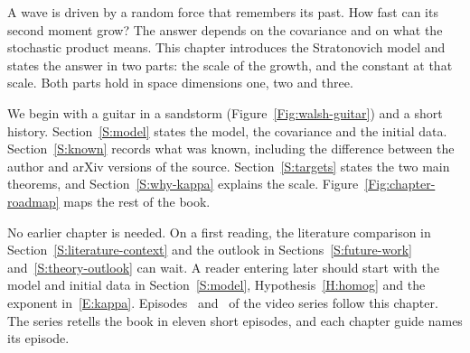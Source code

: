 A wave is driven by a random force that remembers its past. How fast can
its second moment grow? The answer depends on the covariance and on what the
stochastic product means. This chapter introduces the Stratonovich model and
states the answer in two parts: the scale of the growth, and the constant
at that scale. Both parts hold in space dimensions one, two and three.

We begin with a guitar in a sandstorm (Figure~\ref{Fig:walsh-guitar})
and a short history. Section~\ref{S:model} states the model, the
covariance and the initial data. Section~\ref{S:known} records what was
known, including the difference between the author and arXiv versions
of the source. Section~\ref{S:targets} states the two main theorems, and
Section~\ref{S:why-kappa} explains the scale. Figure~\ref{Fig:chapter-roadmap}
maps the rest of the book.

No earlier chapter is needed. On a first reading, the literature
comparison in Section~\ref{S:literature-context} and the outlook
in Sections~\ref{S:future-work} and~\ref{S:theory-outlook} can
wait. A reader entering later should start with the model and
initial data in Section~\ref{S:model}, Hypothesis~\ref{H:homog} and
the exponent in~\eqref{E:kappa}. Episodes~
and~ of the video series follow this chapter. The
series retells the book in eleven short episodes, and each chapter guide
names its episode.
